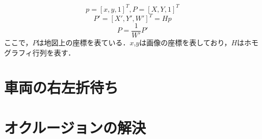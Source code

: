       \begin{equation}
  p = [x, y, 1]^T, P = [X, Y, 1]^T
\end{equation}
\begin{equation}
  P' = [X', Y', W']^T = Hp
\end{equation}
\begin{equation}
  P = \frac{1}{W'}P'
\end{equation}
ここで，$P$は地図上の座標を表ている．$x$,$y$は画像の座標を表しており，$H$はホモグラフィ行列を表す．

\section{車両の右左折待ち}

\section{オクルージョンの解決}


\newpage
